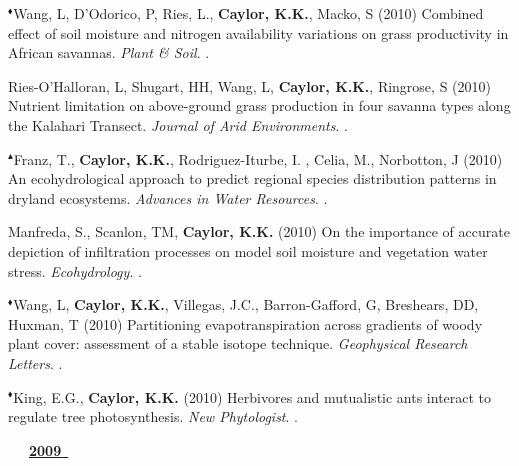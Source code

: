\begin{etaremune}
\item $^{\blacklozenge}$Wang, L, D'Odorico, P, Ries, L., \textbf{ Caylor, K.K.}, Macko, S (2010) Combined effect of soil moisture and nitrogen availability variations on grass productivity in African savannas. \emph{Plant \& Soil}. .
\item Ries-O'Halloran, L, Shugart, HH, Wang, L, \textbf{ Caylor, K.K.}, Ringrose, S (2010) Nutrient limitation on above-ground grass production in four savanna types along the Kalahari Transect. \emph{Journal of Arid Environments}. .
\item $^{\blacktriangle}$Franz, T., \textbf{ Caylor, K.K.}, Rodriguez-Iturbe, I. , Celia, M., Norbotton, J (2010) An ecohydrological approach to  predict regional species distribution patterns in dryland ecosystems. \emph{Advances in Water Resources}. .
\item Manfreda, S., Scanlon, TM, \textbf{ Caylor, K.K.} (2010) On the importance of accurate depiction of infiltration processes on model soil moisture and vegetation water stress. \emph{Ecohydrology}. .
\item $^{\blacklozenge}$Wang, L, \textbf{ Caylor, K.K.}, Villegas, J.C., Barron-Gafford, G, Breshears, DD, Huxman, T (2010) Partitioning evapotranspiration across gradients of woody plant cover: assessment of a stable isotope technique. \emph{Geophysical Research Letters}. .
\item $^{\blacklozenge}$King, E.G., \textbf{ Caylor, K.K.} (2010) Herbivores and mutualistic ants interact to regulate tree photosynthesis. \emph{New Phytologist}. .

\vspace{0.1in}
\mbox{\ \ \ \underline{\textbf{2009 }}}
\vspace{0.1in}


\end{etaremune}
